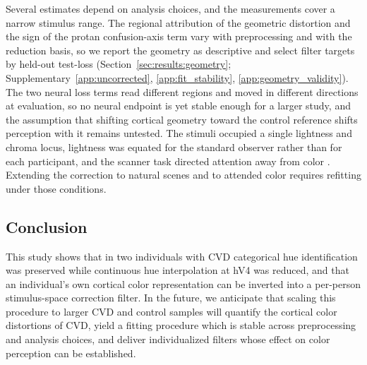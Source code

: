 Several estimates depend on analysis choices, and the measurements cover a narrow stimulus range. The regional attribution of the geometric distortion and the sign of the protan confusion-axis term vary with preprocessing and with the reduction basis, so we report the geometry as descriptive and select filter targets by held-out test-loss (Section~\ref{sec:results:geometry}; Supplementary~\cref{app:uncorrected}, \cref{app:fit_stability}, \cref{app:geometry_validity}). The two neural loss terms read different regions and moved in different directions at evaluation, so no neural endpoint is yet stable enough for a larger study, and the assumption that shifting cortical geometry toward the control reference shifts perception with it remains untested. The stimuli occupied a single lightness and chroma locus, lightness was equated for the standard observer rather than for each participant, and the scanner task directed attention away from color \parencite{brouwer2013}. Extending the correction to natural scenes and to attended color requires refitting under those conditions.

\subsection{Conclusion}
This study shows that in two individuals with CVD categorical hue identification was preserved while continuous hue interpolation at hV4 was reduced, and that an individual's own cortical color representation can be inverted into a per-person stimulus-space correction filter. In the future, we anticipate that scaling this procedure to larger CVD and control samples will quantify the cortical color distortions of CVD, yield a fitting procedure which is stable across preprocessing and analysis choices, and deliver individualized filters whose effect on color perception can be established.

